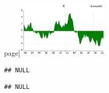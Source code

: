 \documentclass[
]{article}
\newenvironment{Shaded}{\begin{snugshade}}{\end{snugshade}}
\newcommand{\ErrorTok}[1]{\textcolor[rgb]{0.64,0.00,0.00}{\textbf{#1}}}
\newcommand{\FunctionTok}[1]{\textcolor[rgb]{0.00,0.00,0.00}{#1}}
\newcommand{\NormalTok}[1]{#1}
\newcommand{\SpecialCharTok}[1]{\textcolor[rgb]{0.00,0.00,0.00}{#1}}
\newcommand{\StringTok}[1]{\textcolor[rgb]{0.31,0.60,0.02}{#1}}
\begin{document}
page\label{fig:ev-6}]{\includegraphics[width=0.33\textwidth,height=0.25\textwidth]{test_files/figure-latex//ev-EviewsR3-GRAPH1} }

\begin{Shaded}
\end{Shaded}

\begin{verbatim}
## NULL
\end{verbatim}

\begin{Shaded}
\end{Shaded}

\begin{verbatim}
## NULL
\end{verbatim}

\begin{Shaded}
\end{Shaded}
\end{document}
